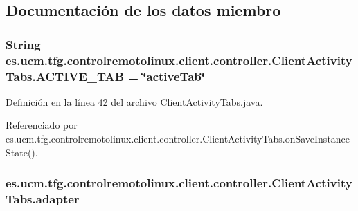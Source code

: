 \subsection{Documentación de los datos miembro}
\hypertarget{classes_1_1ucm_1_1tfg_1_1controlremotolinux_1_1client_1_1controller_1_1ClientActivityTabs_a070c5a04cbd25078ced59c7bbe7456ba}{
\subsubsection[{A\-C\-T\-I\-V\-E\-\_\-\-T\-A\-B}]{\setlength{\rightskip}{0pt plus 5cm}String es.\-ucm.\-tfg.\-controlremotolinux.\-client.\-controller.\-Client\-Activity\-Tabs.\-A\-C\-T\-I\-V\-E\-\_\-\-T\-A\-B = \char`\"{}active\-Tab\char`\"{}\hspace{0.3cm}{\ttfamily [static]}}}\label{classes_1_1ucm_1_1tfg_1_1controlremotolinux_1_1client_1_1controller_1_1ClientActivityTabs_a070c5a04cbd25078ced59c7bbe7456ba}


Definición en la línea 42 del archivo Client\-Activity\-Tabs.\-java.



Referenciado por es.\-ucm.\-tfg.\-controlremotolinux.\-client.\-controller.\-Client\-Activity\-Tabs.\-on\-Save\-Instance\-State().

\hypertarget{classes_1_1ucm_1_1tfg_1_1controlremotolinux_1_1client_1_1controller_1_1ClientActivityTabs_ae89e47227f81294e72d3243d462184cd}{
\subsubsection[{adapter}]{ es.\-ucm.\-tfg.\-controlremotolinux.\-client.\-controller.\-Client\-Activity\-Tabs.\-adapter\hspace{0.3cm}{\ttfamily [private]}}}\label{classes_1_1ucm_1_1tfg_1_1controlremotolinux_1_1client_1_1controller_1_1ClientActivityTabs_ae89e47227f81294e72d3243d462184cd}


